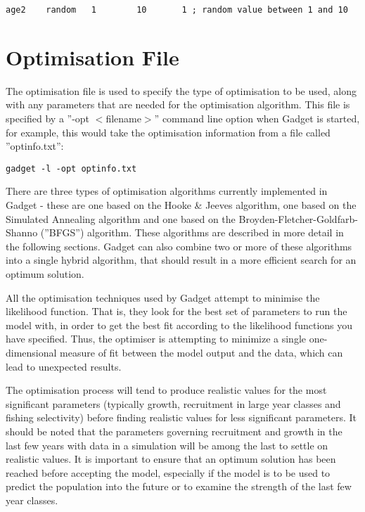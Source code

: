 \documentclass[10pt,twoside]{book}
\begin{document}
{\small\begin{verbatim}
age2    random   1        10       1 ; random value between 1 and 10
\end{verbatim}}

\chapter{Optimisation File}\label{chap:optim}
The optimisation file is used to specify the type of optimisation to be used, along with any parameters that are needed for the optimisation algorithm.  This file is specified by a ''-opt $<$filename$>$'' command line option when Gadget is started, for example, this would take the optimisation information from a file called ''optinfo.txt'':

{\small\begin{verbatim}
gadget -l -opt optinfo.txt
\end{verbatim}}

There are three types of optimisation algorithms currently implemented in Gadget - these are one based on the Hooke \& Jeeves algorithm, one based on the Simulated Annealing algorithm and one based on the Broyden-Fletcher-Goldfarb-Shanno (''BFGS'') algorithm.  These algorithms are described in more detail in the following sections.  Gadget can also combine two or more of these algorithms into a single hybrid algorithm, that should result in a more efficient search for an optimum solution.

\bigskip
All the optimisation techniques used by Gadget attempt to minimise the likelihood function. That is, they look for the best set of parameters to run the model with, in order to get the best fit according to the likelihood functions you have specified.  Thus, the optimiser is attempting to minimize a single one-dimensional measure of fit between the model output and the data, which can lead to unexpected results.

\bigskip
The optimisation process will tend to produce realistic values for the most significant parameters (typically growth, recruitment in large year classes and fishing selectivity) before finding realistic values for less significant parameters.  It should be noted that the parameters governing recruitment and growth in the last few years with data in a simulation will be among the last to settle on realistic values.  It is important to ensure that an optimum solution has been reached before accepting the model, especially if the model is to be used to predict the population into the future or to examine the strength of the last few year classes.
\end{document}
